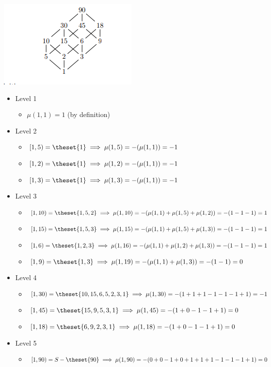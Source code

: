\includegraphics{2019-06-09-15-13-51.png}

\begin{itemize}
\tightlist
\item
  Level 1

  \begin{itemize}
  \tightlist
  \item
    \(\mu(1,1) = 1\) (by definition)
  \end{itemize}
\item
  Level 2

  \begin{itemize}
  \tightlist
  \item
    \([1, 5) = \theset{1} \implies \mu(1,5) = -(\mu(1,1)) = -1\)
  \item
    \([1, 2) = \theset{1} \implies \mu(1,2) = -(\mu(1,1)) = -1\)
  \item
    \([1, 3) = \theset{1} \implies \mu(1,3) = -(\mu(1,1)) = -1\)
  \end{itemize}
\item
  Level 3

  \begin{itemize}
  \tightlist
  \item
    \([1, 10) = \theset{1,5,2} \implies \mu(1,10) = -(\mu(1,1)+\mu(1,5)+\mu(1,2))= -(1-1-1) = 1\)
  \item
    \([1, 15) = \theset{1,5,3} \implies \mu(1,15) = -(\mu(1,1)+\mu(1,5)+\mu(1,3))= -(1-1-1) = 1\)
  \item
    \([1, 6) = \theset{1,2,3} \implies \mu(1,16) = -(\mu(1,1)+\mu(1,2)+\mu(1,3))= -(1-1-1) = 1\)
  \item
    \([1, 9) = \theset{1,3} \implies \mu(1,19) = -(\mu(1,1)+\mu(1,3)) = -(1-1) = 0\)
  \end{itemize}
\item
  Level 4

  \begin{itemize}
  \tightlist
  \item
    \([1,30) = \theset{10,15,6,5,2,3,1} \implies \mu(1,30) = -(1+1+1-1-1-1+1) = -1\)
  \item
    \([1,45) = \theset{15,9,5,3,1} \implies \mu(1,45) = -(1+0-1-1+1) = 0\)
  \item
    \([1,18) = \theset{6,9,2,3,1} \implies \mu(1,18) = -(1+0-1-1+1) = 0\)
  \end{itemize}
\item
  Level 5

  \begin{itemize}
  \tightlist
  \item
    \([1, 90) = S - \theset{90} \implies \mu(1,90) = -(0+0-1+0+1+1+1-1-1-1+1) = 0\)
  \end{itemize}
\end{itemize}

